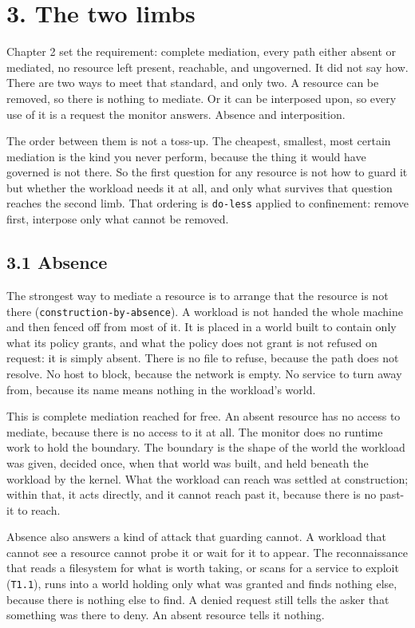 \hypertarget{the-two-limbs}{%
\chapter{3. The two limbs}\label{the-two-limbs}}

Chapter 2 set the requirement: complete mediation, every path either
absent or mediated, no resource left present, reachable, and ungoverned.
It did not say how. There are two ways to meet that standard, and only
two. A resource can be removed, so there is nothing to mediate. Or it
can be interposed upon, so every use of it is a request the monitor
answers. Absence and interposition.

The order between them is not a toss-up. The cheapest, smallest, most
certain mediation is the kind you never perform, because the thing it
would have governed is not there. So the first question for any resource
is not how to guard it but whether the workload needs it at all, and
only what survives that question reaches the second limb. That ordering
is \texttt{do-less} applied to confinement: remove first, interpose only
what cannot be removed.

\hypertarget{absence}{%
\section{3.1 Absence}\label{absence}}

The strongest way to mediate a resource is to arrange that the resource
is not there (\texttt{construction-by-absence}). A workload is not
handed the whole machine and then fenced off from most of it. It is
placed in a world built to contain only what its policy grants, and what
the policy does not grant is not refused on request: it is simply
absent. There is no file to refuse, because the path does not resolve.
No host to block, because the network is empty. No service to turn away
from, because its name means nothing in the workload's world.

This is complete mediation reached for free. An absent resource has no
access to mediate, because there is no access to it at all. The monitor
does no runtime work to hold the boundary. The boundary is the shape of
the world the workload was given, decided once, when that world was
built, and held beneath the workload by the kernel. What the workload
can reach was settled at construction; within that, it acts directly,
and it cannot reach past it, because there is no past-it to reach.

Absence also answers a kind of attack that guarding cannot. A workload
that cannot see a resource cannot probe it or wait for it to appear. The
reconnaissance that reads a filesystem for what is worth taking, or
scans for a service to exploit (\texttt{T1.1}), runs into a world
holding only what was granted and finds nothing else, because there is
nothing else to find. A denied request still tells the asker that
something was there to deny. An absent resource tells it nothing.

